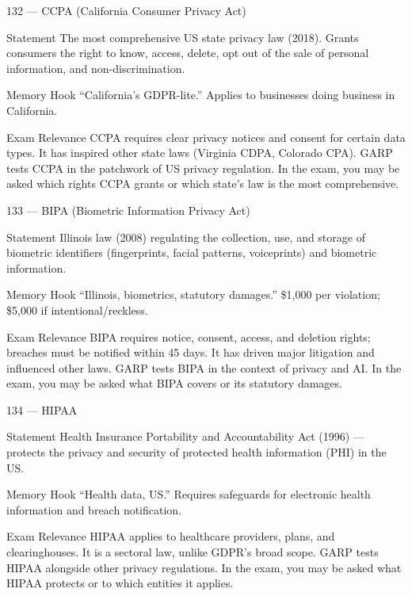 \documentclass[aspectratio=169,8pt]{beamer}
\begin{document}
	\begin{frame}{132 --- CCPA (California Consumer Privacy Act)}
		\begin{block}{Statement}
			The most comprehensive US state privacy law (2018). Grants consumers the right to know, access, delete, opt out of the sale of personal information, and non-discrimination.
		\end{block}
		\begin{block}{Memory Hook}
			``California's GDPR-lite.'' Applies to businesses doing business in California.
		\end{block}
		\begin{block}{Exam Relevance}
			CCPA requires clear privacy notices and consent for certain data types. It has inspired other state laws (Virginia CDPA, Colorado CPA). GARP tests CCPA in the patchwork of US privacy regulation. In the exam, you may be asked which rights CCPA grants or which state's law is the most comprehensive.
		\end{block}
	\end{frame}
	
	\begin{frame}{133 --- BIPA (Biometric Information Privacy Act)}
		\begin{block}{Statement}
			Illinois law (2008) regulating the collection, use, and storage of biometric identifiers (fingerprints, facial patterns, voiceprints) and biometric information.
		\end{block}
		\begin{block}{Memory Hook}
			``Illinois, biometrics, statutory damages.'' \$1,000 per violation; \$5,000 if intentional/reckless.
		\end{block}
		\begin{block}{Exam Relevance}
			BIPA requires notice, consent, access, and deletion rights; breaches must be notified within 45 days. It has driven major litigation and influenced other laws. GARP tests BIPA in the context of privacy and AI. In the exam, you may be asked what BIPA covers or its statutory damages.
		\end{block}
	\end{frame}
	
	\begin{frame}{134 --- HIPAA}
		\begin{block}{Statement}
			Health Insurance Portability and Accountability Act (1996) --- protects the privacy and security of protected health information (PHI) in the US.
		\end{block}
		\begin{block}{Memory Hook}
			``Health data, US.'' Requires safeguards for electronic health information and breach notification.
		\end{block}
		\begin{block}{Exam Relevance}
			HIPAA applies to healthcare providers, plans, and clearinghouses. It is a sectoral law, unlike GDPR's broad scope. GARP tests HIPAA alongside other privacy regulations. In the exam, you may be asked what HIPAA protects or to which entities it applies.
		\end{block}
	\end{frame}
	
\end{document}
